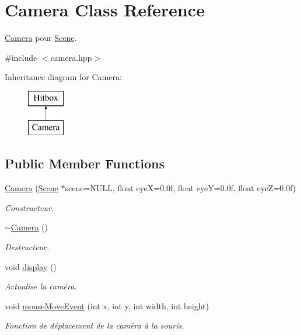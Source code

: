 \hypertarget{class_camera}{\section{Camera Class Reference}
\label{class_camera}
}


\hyperlink{class_camera}{Camera} pour \hyperlink{class_scene}{Scene}.  




{\ttfamily \#include $<$camera.\+hpp$>$}

Inheritance diagram for Camera\+:\begin{figure}[H]
\begin{center}
\leavevmode
\includegraphics[height=2.000000cm]{class_camera}
\end{center}
\end{figure}
\subsection*{Public Member Functions}
\begin{DoxyCompactItemize}
\item 
\hyperlink{class_camera_a1a8ac754efe577c8abbc1e19cc8bca25}{Camera} (\hyperlink{class_scene}{Scene} $\ast$scene=N\+U\+L\+L, float eye\+X=0.\+0f, float eye\+Y=0.\+0f, float eye\+Z=0.\+0f)
\begin{DoxyCompactList}\small\item\em Constructeur. \end{DoxyCompactList}\item 
\hyperlink{class_camera_ad1897942d0ccf91052386388a497349f}{$\sim$\+Camera} ()
\begin{DoxyCompactList}\small\item\em Destructeur. \end{DoxyCompactList}\item 
void \hyperlink{class_camera_adbfdac30f082ddea86183c1c31493946}{display} ()
\begin{DoxyCompactList}\small\item\em Actualise la caméra. \end{DoxyCompactList}\item 
void \hyperlink{class_camera_a22aaf20b581d402e5c3952655b830c0f}{mouse\+Move\+Event} (int x, int y, int width, int height)
\begin{DoxyCompactList}\small\item\em Fonction de déplacement de la caméra à la souris. \end{DoxyCompactList}\end{DoxyCompactItemize}
